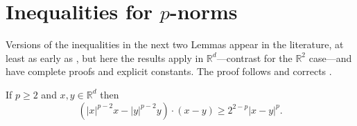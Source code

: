 \documentclass[final,leqno,onefignum,onetabnum]{siamltex1213bueler}
\newcommand\RR{\mathbb{R}}
\begin{document}




\appendix

\section{Inequalities for $p$-norms}   \label{app:pinequalities}  Versions of the inequalities in the next two Lemmas appear in the literature, at least as early as \cite{GlowinskiMarroco1975}, but here the results apply in $\RR^d$---contrast \cite{BarrettLiu1993,GlowinskiMarroco1975} for the $\RR^2$ case---and have complete proofs and explicit constants.  The proof follows and corrects \cite[Appendix A]{Peral1997}.

\begin{lemma}  \label{lem:pbiginequality}  If $p\ge 2$ and $x,y\in\RR^d$ then
\begin{equation}
\left(|x|^{p-2} x - |y|^{p-2} y\right)\cdot(x-y) \ge 2^{2-p} |x-y|^p. \label{eq:pbiginequality}
\end{equation}
\end{lemma}
\end{document}
